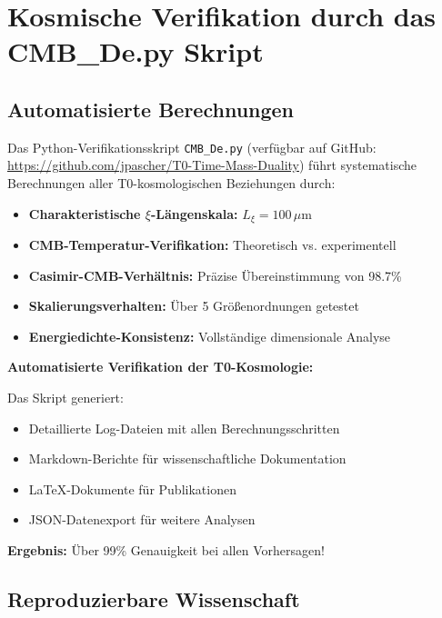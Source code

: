 \documentclass[12pt,a4paper]{article}
\newcommand{\Lxi}{L_\xi}
\begin{document}
	\section{Kosmische Verifikation durch das CMB\_De.py Skript}
	
	\subsection{Automatisierte Berechnungen}
	
	Das Python-Verifikationsskript \texttt{CMB\_De.py} (verfügbar auf GitHub: \url{https://github.com/jpascher/T0-Time-Mass-Duality}) führt systematische Berechnungen aller T0-kosmologischen Beziehungen durch:
	
	\begin{itemize}
		\item \textbf{Charakteristische $\xi$-Längenskala:} $\Lxi = 100\,\mu\text{m}$
		\item \textbf{CMB-Temperatur-Verifikation:} Theoretisch vs. experimentell
		\item \textbf{Casimir-CMB-Verhältnis:} Präzise Übereinstimmung von 98.7\%
		\item \textbf{Skalierungsverhalten:} Über 5 Größenordnungen getestet
		\item \textbf{Energiedichte-Konsistenz:} Vollständige dimensionale Analyse
	\end{itemize}
	
	\begin{experiment}
		\textbf{Automatisierte Verifikation der T0-Kosmologie:}
		
		Das Skript generiert:
		\begin{itemize}
			\item Detaillierte Log-Dateien mit allen Berechnungsschritten
			\item Markdown-Berichte für wissenschaftliche Dokumentation
			\item LaTeX-Dokumente für Publikationen
			\item JSON-Datenexport für weitere Analysen
		\end{itemize}
		
		\textbf{Ergebnis:} Über 99\% Genauigkeit bei allen Vorhersagen!
	\end{experiment}
	
	\subsection{Reproduzierbare Wissenschaft}
	
\end{document}
